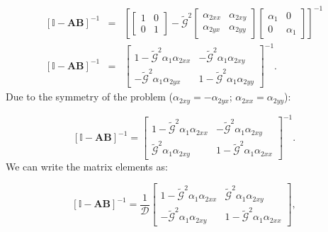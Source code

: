 \begin{eqnarray}
\left[\mathbb{I}-\mathbf{A}\mathbf{B}\right]^{-1} & = & \left[\begin{bmatrix}1 & 0\\
0 & 1
\end{bmatrix}-\tilde{\mathcal{G}}^{2}\begin{bmatrix}\alpha_{2xx} & \alpha_{2xy}\\
\alpha_{2yx} & \alpha_{2yy}
\end{bmatrix}\begin{bmatrix}\alpha_{1} & 0\\
0 & \alpha_{1}
\end{bmatrix}\right]^{-1} \nonumber\\
\left[\mathbb{I}-\mathbf{A}\mathbf{B}\right]^{-1} & = & \begin{bmatrix}1-\tilde{\mathcal{G}}^{2}\alpha_{1}\alpha_{2xx} & -\tilde{\mathcal{G}}^{2}\alpha_{1}\alpha_{2xy}\\
-\tilde{\mathcal{G}}^{2}\alpha_{1}\alpha_{2yx} & 1-\tilde{\mathcal{G}}^{2}\alpha_{1}\alpha_{2yy}
\end{bmatrix}^{-1}. \label{eq:app4_common_matrix}
\end{eqnarray}
Due to the symmetry of the problem ($\alpha_{2xy}=-\alpha_{2yx}$;
$\alpha_{2xx}=\alpha_{2yy}$):

\begin{equation}
\left[\mathbb{I}-\mathbf{A}\mathbf{B}\right]^{-1}=\begin{bmatrix}1-\tilde{\mathcal{G}}^{2}\alpha_{1}\alpha_{2xx} & -\tilde{\mathcal{G}}^{2}\alpha_{1}\alpha_{2xy}\nonumber\\
\tilde{\mathcal{G}}^{2}\alpha_{1}\alpha_{2xy} & 1-\tilde{\mathcal{G}}^{2}\alpha_{1}\alpha_{2xx}
\end{bmatrix}^{-1}.\label{eq:app4_common_matrix}
\end{equation}
We can write the matrix elements as:

\begin{equation}
\left[\mathbb{I}-\mathbf{A}\mathbf{B}\right]^{-1}=\frac{1}{\mathcal{D}}\begin{bmatrix}1-\tilde{\mathcal{G}}^{2}\alpha_{1}\alpha_{2xx} & \tilde{\mathcal{G}}^{2}\alpha_{1}\alpha_{2xy}\\
-\tilde{\mathcal{G}}^{2}\alpha_{1}\alpha_{2xy} & 1-\tilde{\mathcal{G}}^{2}\alpha_{1}\alpha_{2xx}
\end{bmatrix},
\end{equation}

